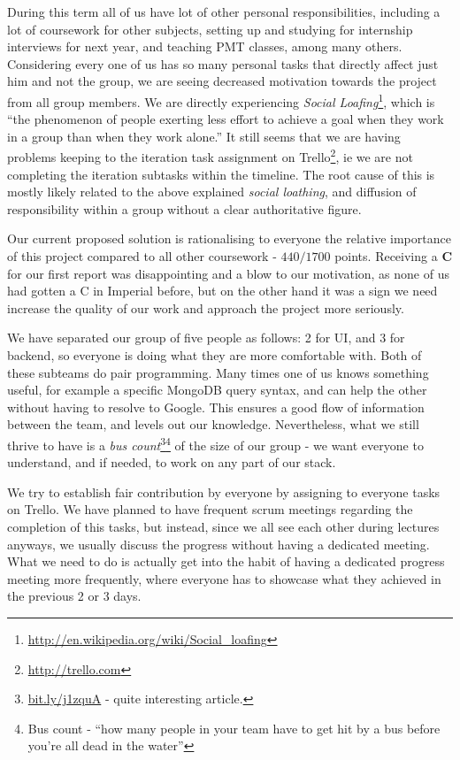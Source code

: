 \documentclass[a4paper,12pt]{article}
\begin{document}
	During this term all of us have lot of other personal responsibilities, including a lot of coursework for other subjects, setting up and studying for internship interviews for next year, and teaching PMT classes, among many others. Considering every one of us has so many personal tasks that directly affect just him and not the group, we are seeing decreased motivation towards the project from all group members. We are directly experiencing \emph{Social Loafing}\footnote{\url{http://en.wikipedia.org/wiki/Social_loafing}}, which is ``the phenomenon of people exerting less effort to achieve a goal when they work in a group than when they work alone.'' It still seems that we are having problems keeping to the iteration task assignment on Trello\footnote{\url{http://trello.com}}, ie we are not completing the iteration subtasks within the timeline. The root cause of this is mostly likely related to the above explained \emph{social loathing}, and diffusion of responsibility within a group without a clear authoritative figure.
	
	Our current proposed solution is rationalising to everyone the relative importance of this project compared to all other coursework - $440/1700$ points. Receiving a \textbf{C} for our first report was disappointing and a blow to our motivation, as none of us had gotten a C in Imperial before, but on the other hand it was a sign we need increase the quality of our work and approach the project more seriously.
	
	We have separated our group of five people as follows: 2 for UI, and 3 for backend, so everyone is doing what they are more comfortable with. Both of these subteams do pair programming. Many times one of us knows something useful, for example a specific MongoDB query syntax, and can help the other without having to resolve to Google. This ensures a good flow of information between the team, and levels out our knowledge. Nevertheless, what we still thrive to have is a \emph{bus count}\footnote{\url{bit.ly/j1zquA} - quite interesting article.}\footnote{Bus count - ``how many people in your team have to get hit by a bus before you’re all dead in the water''} of the size of our group - we want everyone to understand, and if needed, to work on any part of our stack.
	
	We try to establish fair contribution by everyone by assigning to everyone tasks on Trello. We have planned to have frequent scrum meetings regarding the completion of this tasks, but instead, since we all see each other during lectures anyways, we usually discuss the progress without having a dedicated meeting. What we need to do is actually get into the habit of having a dedicated progress meeting more frequently, where everyone has to showcase what they achieved in the previous 2 or 3 days.
	
\end{document}

